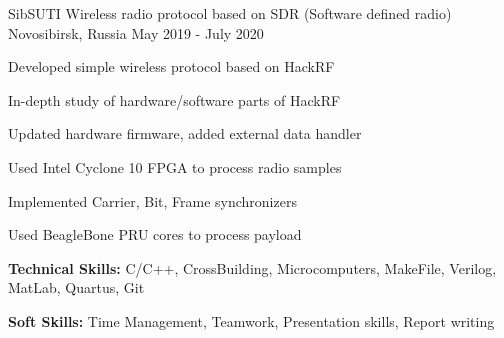 

\begin{cventries}

  \cventry
    {SibSUTI} %
    {Wireless radio protocol based on SDR (Software defined radio)} %
    {Novosibirsk, Russia} %
    {May 2019 - July 2020} %
    {
      \begin{cvitems} %
        \item {Developed simple wireless protocol based on HackRF}
        \item {In-depth study of hardware/software parts of HackRF}
        \item {Updated hardware firmware, added external data handler}
        \item {Used Intel Cyclone 10 FPGA to process radio samples}
        \item {Implemented Carrier, Bit, Frame synchronizers}
        \item {Used BeagleBone PRU cores to process payload}
        \item {\textbf{Technical Skills:} C/C++, CrossBuilding, Microcomputers, MakeFile, Verilog, MatLab, Quartus, Git}
        \item {\textbf{Soft Skills:} Time Management, Teamwork, Presentation skills, Report writing}
      \end{cvitems}
    }


\end{cventries}
